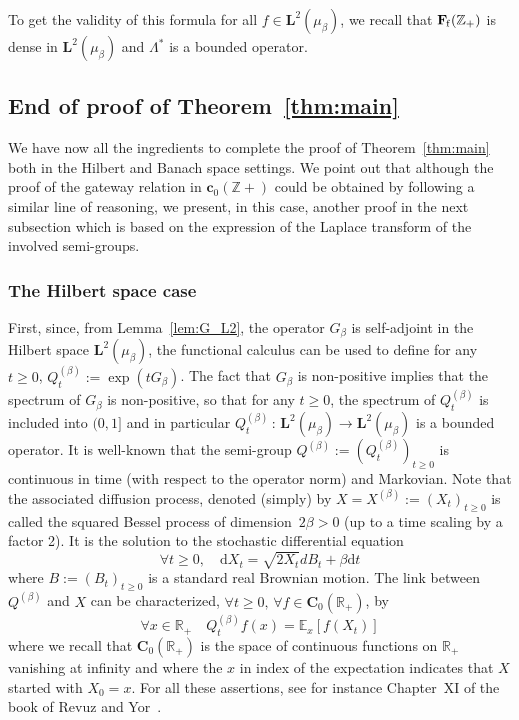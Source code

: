 \documentclass[AHL,Unicode,longabstracts]{cedram}
\newcommand{\df}{\mathrel{:=}}
\newcommand{\cC}{{\mathbf C}}
\newcommand{\EE}{\mathbb{E}}
\newcommand{\RR}{\mathbb{R}}
\newcommand{\ZZ}{\mathbb{Z}}
\newcommand{\ri}{\rightarrow}
\newcommand{\st}{\,:\,}
\newcommand{\Bg}{G}
\newcommand{\Bs}{Q}
\newcommand{\esL}{\mathbf{L}}
\newcommand{\esF}{\mathbf{F}}
\newcommand{\esc}{\mathbf{c}}
\newcommand{\esFf}{\esF_{\hskip-.3mm\mathrm{f}}}
\newcommand{\adjL}{\Lambda^*}
\let\oldforall\forall
\renewcommand*{\forall}{\mathrel{\oldforall}}
\newcommand*{\dd}{\mathrm{d}}
\newcommand*{\dt}{\dd t}
\begin{document}
To get the validity of this formula for all $f\in\esL^2(\mu_{\beta})$, we recall that $\esFf(\ZZ_+)$ is dense in $\esL^2(\mu_{\beta})$ and $\adjL $ is a bounded operator.

\subsection{End of proof of Theorem~\ref{thm:main}} \label{sec:proof_main}

We have now all the ingredients to complete the proof of Theorem~\ref{thm:main} both in the Hilbert and Banach space settings. We point out that although the proof of the gateway relation in $\esc_0(\ZZ+)$ could be obtained by following a similar line of reasoning, we present, in this case, another proof in the next subsection which is based on the expression of the Laplace transform of the involved semi-groups.

\subsubsection{The Hilbert space case}

First, since, from Lemma~\ref{lem:G_L2}, the operator $\Bg_{\beta}$ is self-adjoint in the Hilbert space $\esL^2(\mu_{\beta})$, the functional calculus can be used to define for any $t\geq 0$, $Q_t^{(\beta)}\df\exp(t\Bg_{\beta})$. The fact that $\Bg_{\beta}$ is non-positive implies that the spectrum of $\Bg_{\beta}$ is non-positive, so that for any $t\geq 0$, the spectrum of $\Bs_t^{(\beta)}$ is included into $(0,1]$ and in particular $\Bs^{(\beta)}_t\st \esL^2(\mu_{\beta})\ri\esL^2(\mu_{\beta})$ is a bounded operator. It is well-known that the semi-group $\Bs^{(\beta)}\df(\Bs_t^{(\beta)})_{t\geq 0}$ is continuous in time (with respect to the operator norm) and Markovian. Note that the associated diffusion process, denoted (simply) by $X=X^{(\beta)}\df(X_t)_{t\geq 0}$ is called the squared Bessel process of dimension~$2\beta>0$ (up to a time scaling by a factor 2). It is the solution to the stochastic differential equation
\begin{equation}\label{Bessel}
\forall t\geq 0,\quad \dd X_t=\sqrt{2X_t}dB_t+\beta \dt
\end{equation}
where $B\df(B_t)_{t\geq 0}$ is a standard real Brownian motion. The link between $\Bs^{(\beta)}$ and $X$ can be characterized, $\forall t\geq 0,\,\forall f\in\cC_{0}(\RR_+)$, by
\begin{equation}\label{Pb}
\forall x\in\RR_+\quad \Bs^{(\beta)}_t f(x)=\EE_{x}[f(X_t)]
\end{equation}
where we recall that $\cC_{0}(\RR_+)$ is the space of continuous functions on $\RR_+$ vanishing at infinity and where the $x$ in index of the expectation indicates that $X$ started with $X_0=x$. For all these assertions, see for instance Chapter~XI of the book of Revuz and Yor~\cite{MR1725357}.
\end{document}
